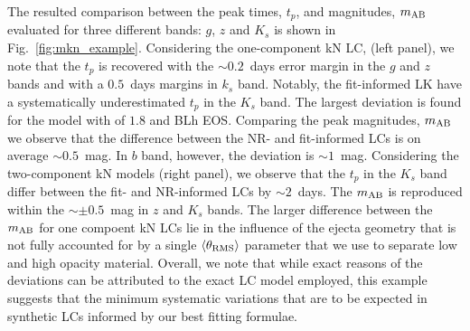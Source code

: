 The resulted comparison between the peak times, $t_p$, and magnitudes, $m_{\rm AB}$ 
evaluated for three different bands: $g$, $z$ and $K_s$ 
is shown in Fig.~\ref{fig:mkn_example}.
Considering the one-component \ac{kN} \ac{LC}, (left panel), we note that the $t_p$ is 
recovered with the ${\sim}0.2$~days error margin in the $g$ and $z$ bands and with a 
$0.5$~days margins in $k_s$ band. Notably, the fit-informed \ac{LK} have a systematically
underestimated $t_p$ in the $K_s$ band. 
The largest deviation is found for the model with \mr{} of $1.8$ and BLh \ac{EOS}.
Comparing the peak magnitudes, $m_{\rm AB}$ we observe that the difference 
between the \ac{NR}- and fit-informed \acp{LC} is on average ${\sim}0.5$~mag. 
In $b$ band, however, the deviation is ${\sim}1$~mag.
Considering the two-component \ac{kN} models (right panel), we observe that the 
$t_p$ in the $K_s$ band differ between the fit- and \ac{NR}-informed \acp{LC} by 
${\sim}2$~days. The $m_{\rm AB}$ is reproduced within the ${\sim}\pm 0.5$~mag in $z$ 
and $K_s$ bands.
The larger difference between the $m_{\rm AB}$ for one compoent \ac{kN} \acp{LC} lie 
in the influence of the ejecta geometry that is not fully accounted for by a single 
$\langle\theta_{\rm RMS}\rangle$ parameter that we use to separate low and high opacity material. 
%
Overall, we note that while exact reasons of the deviations can be attributed to 
the exact \ac{LC} model employed, this example suggests that the minimum systematic 
variations that are to be expected in synthetic \acp{LC} informed by our best fitting formulae.
